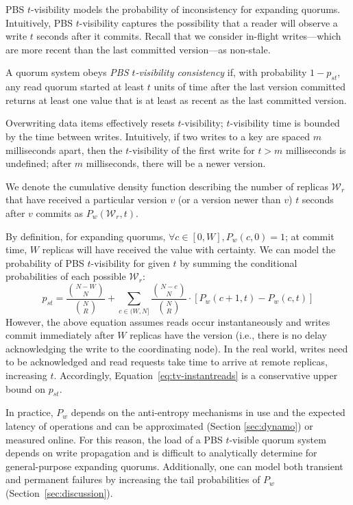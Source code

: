 \documentclass{vldb}
\begin{document}
PBS $t$-visibility models the probability of inconsistency for
expanding quorums.  Intuitively, PBS $t$-visibility captures the
possibility that a reader will observe a write $t$ seconds after it
commits.  Recall that we consider in-flight writes---which are more
recent than the last committed version---as non-stale.

\begin{definition}
A quorum system obeys \textit{PBS $t$-visibility consistency} if, with
probability $1-p_{st}$, any read quorum started at least $t$ units
of time after the last version committed returns at least one value
that is at least as recent as the last committed version.
\end{definition}

Overwriting data items effectively resets $t$-visibility;
$t$-visibility time is bounded by the time between writes.
Intuitively, if two writes to a key are spaced $m$ milliseconds apart,
then the $t$-visibility of the first write for $t > m$ milliseconds is
undefined; after $m$ milliseconds, there will be a newer version.

We denote the cumulative density function describing the number of
replicas $\mathcal{W}_r$ that have received a particular version $v$ (or
a version newer than $v$) $t$ seconds after $v$ commits as
$P_w(\mathcal{W}_r, t)$.

By definition, for expanding quorums, $\forall c \in [0, W], P_w(c,0)
= 1$; at commit time, $W$ replicas will have received the value with
certainty.  We can model the probability of PBS $t$-visibility for given $t$ by summing the conditional probabilities of each possible
$\mathcal{W}_r$:
\begin{equation}
\label{eq:tv-instantreads}
p_{st} = \frac{{N-W \choose N}}{{N \choose R}}+\sum_{c\in(W, N]} \frac{{N-c \choose N}}{{N \choose R}}\cdot [P_w(c+1, t)-P_w(c,t)]
\end{equation}
However, the above equation assumes reads occur instantaneously and
writes commit immediately after $W$ replicas have the version (i.e.,
there is no delay acknowledging the write to the coordinating node).
In the real world, writes need to be acknowledged and read requests
take time to arrive at remote replicas, increasing $t$.  Accordingly,
Equation~\ref{eq:tv-instantreads} is a conservative upper bound on
$p_{st}$.

In practice, $P_w$ depends on the anti-entropy mechanisms in use and
the expected latency of operations and can be approximated (Section
\ref{sec:dynamo}) or measured online.  For this reason, the load of a
PBS $t$-visible quorum system depends on write propagation and is
difficult to analytically determine for general-purpose expanding
quorums.  Additionally, one can model both transient and permanent
failures by increasing the tail probabilities of $P_w$
(Section~\ref{sec:discussion}).
\end{document}
